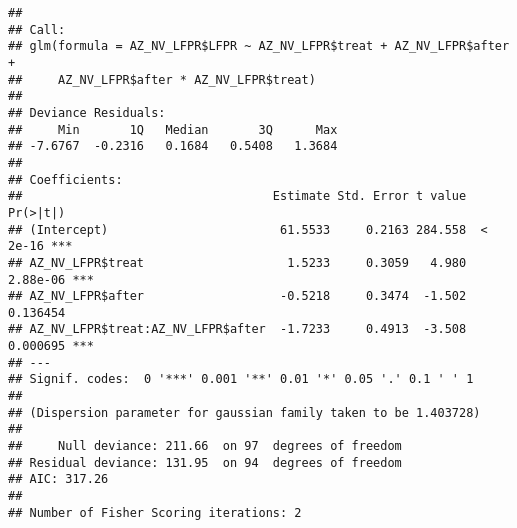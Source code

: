 \documentclass[
]{article}
\newenvironment{Shaded}{\begin{snugshade}}{\end{snugshade}}
\newcommand{\CommentTok}[1]{\textcolor[rgb]{0.56,0.35,0.01}{\textit{#1}}}
\newcommand{\FunctionTok}[1]{\textcolor[rgb]{0.00,0.00,0.00}{#1}}
\newcommand{\NormalTok}[1]{#1}
\newcommand{\OtherTok}[1]{\textcolor[rgb]{0.56,0.35,0.01}{#1}}
\newcommand{\SpecialCharTok}[1]{\textcolor[rgb]{0.00,0.00,0.00}{#1}}
\begin{document}
\begin{Shaded}
\end{Shaded}

\begin{verbatim}
## 
## Call:
## glm(formula = AZ_NV_LFPR$LFPR ~ AZ_NV_LFPR$treat + AZ_NV_LFPR$after + 
##     AZ_NV_LFPR$after * AZ_NV_LFPR$treat)
## 
## Deviance Residuals: 
##     Min       1Q   Median       3Q      Max  
## -7.6767  -0.2316   0.1684   0.5408   1.3684  
## 
## Coefficients:
##                                   Estimate Std. Error t value Pr(>|t|)    
## (Intercept)                        61.5533     0.2163 284.558  < 2e-16 ***
## AZ_NV_LFPR$treat                    1.5233     0.3059   4.980 2.88e-06 ***
## AZ_NV_LFPR$after                   -0.5218     0.3474  -1.502 0.136454    
## AZ_NV_LFPR$treat:AZ_NV_LFPR$after  -1.7233     0.4913  -3.508 0.000695 ***
## ---
## Signif. codes:  0 '***' 0.001 '**' 0.01 '*' 0.05 '.' 0.1 ' ' 1
## 
## (Dispersion parameter for gaussian family taken to be 1.403728)
## 
##     Null deviance: 211.66  on 97  degrees of freedom
## Residual deviance: 131.95  on 94  degrees of freedom
## AIC: 317.26
## 
## Number of Fisher Scoring iterations: 2
\end{verbatim}
\end{document}
